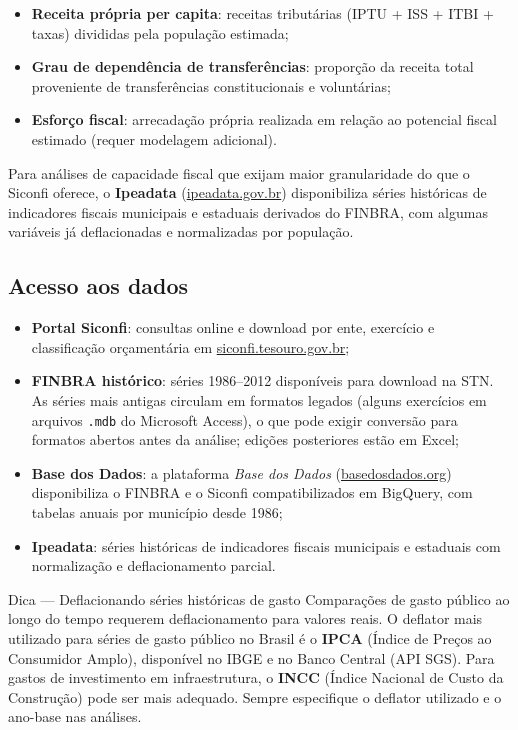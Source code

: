 \begin{itemize}
  \item \textbf{Receita própria per capita}: receitas tributárias (IPTU + ISS + ITBI + taxas) divididas pela população estimada;
  \item \textbf{Grau de dependência de transferências}: proporção da receita total proveniente de transferências constitucionais e voluntárias;
  \item \textbf{Esforço fiscal}: arrecadação própria realizada em relação ao potencial fiscal estimado (requer modelagem adicional).
\end{itemize}

Para análises de capacidade fiscal que exijam maior granularidade do que o Siconfi oferece, o \textbf{Ipeadata} (\url{ipeadata.gov.br}) disponibiliza séries históricas de indicadores fiscais municipais e estaduais derivados do FINBRA, com algumas variáveis já deflacionadas e normalizadas por população.

\subsection{Acesso aos dados}

\begin{itemize}
  \item \textbf{Portal Siconfi}: consultas online e download por ente, exercício e classificação orçamentária em \url{siconfi.tesouro.gov.br};
  \item \textbf{FINBRA histórico}: séries 1986--2012 disponíveis para download na STN. As séries mais antigas circulam em formatos legados (alguns exercícios em arquivos \texttt{.mdb} do Microsoft Access), o que pode exigir conversão para formatos abertos antes da análise; edições posteriores estão em Excel;
  \item \textbf{Base dos Dados}: a plataforma \textit{Base dos Dados} (\url{basedosdados.org}) disponibiliza o FINBRA e o Siconfi compatibilizados em BigQuery, com tabelas anuais por município desde 1986;
  \item \textbf{Ipeadata}: séries históricas de indicadores fiscais municipais e estaduais com normalização e deflacionamento parcial.
\end{itemize}

\begin{boxdica}{Dica --- Deflacionando séries históricas de gasto}
Comparações de gasto público ao longo do tempo requerem deflacionamento para valores reais. O deflator mais utilizado para séries de gasto público no Brasil é o \textbf{IPCA} (Índice de Preços ao Consumidor Amplo), disponível no IBGE e no Banco Central (API SGS). Para gastos de investimento em infraestrutura, o \textbf{INCC} (Índice Nacional de Custo da Construção) pode ser mais adequado. Sempre especifique o deflator utilizado e o ano-base nas análises.
\end{boxdica}


